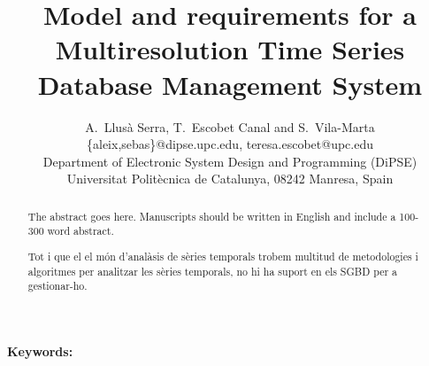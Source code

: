 \documentclass{scrartcl}
\title{
  Model and requirements for a Multiresolution Time Series
  Database Management System }
\author
{
  {
    A.\ Llusà Serra,
    T.\ Escobet Canal
    and S.\ Vila-Marta
  }\\
  {\{aleix,sebas\}@dipse.upc.edu, teresa.escobet@upc.edu}\\
  {Department of Electronic System Design and Programming (DiPSE)}\\
  {Universitat Politècnica de Catalunya, 08242 Manresa, Spain}
}
\begin{document}
\maketitle


\begin{abstract}
The abstract goes here.
Manuscripts should be written in English and include a 100-300 word abstract.

Tot i que el el món d'analàsis de sèries temporals trobem multitud de metodologies i algoritmes per analitzar les sèries temporals, no hi ha suport en els SGBD per a gestionar-ho.
\end{abstract}

{\bfseries Keywords:} 
















\printbibliography{}



% 



















\end{document}
